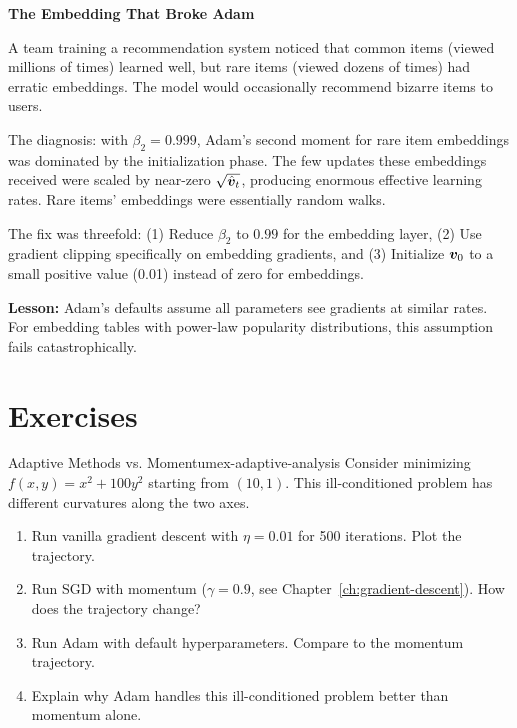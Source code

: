 \documentclass[../../main.tex]{subfiles}
\begin{document}
\begin{warstory}
\textbf{The Embedding That Broke Adam}

A team training a recommendation system noticed that common items (viewed millions of times) learned well, but rare items (viewed dozens of times) had erratic embeddings. The model would occasionally recommend bizarre items to users.

The diagnosis: with $\beta_2 = 0.999$, Adam's second moment for rare item embeddings was dominated by the initialization phase. The few updates these embeddings received were scaled by near-zero $\sqrt{\hat{\boldsymbol{v}}_t}$, producing enormous effective learning rates. Rare items' embeddings were essentially random walks.

The fix was threefold: (1) Reduce $\beta_2$ to $0.99$ for the embedding layer, (2) Use gradient clipping specifically on embedding gradients, and (3) Initialize $\boldsymbol{v}_0$ to a small positive value (0.01) instead of zero for embeddings.

\textbf{Lesson:} Adam's defaults assume all parameters see gradients at similar rates. For embedding tables with power-law popularity distributions, this assumption fails catastrophically.
\end{warstory}

\section{Exercises}
\label{sec:adv-opt-exercises}

\begin{exercise}{Adaptive Methods vs. Momentum}{ex-adaptive-analysis}
Consider minimizing $f(x, y) = x^2 + 100y^2$ starting from $(10, 1)$. This ill-conditioned problem has different curvatures along the two axes.
\begin{enumerate}[label=(\alph*)]
    \item Run vanilla gradient descent with $\eta = 0.01$ for 500 iterations. Plot the trajectory.
    \item Run SGD with momentum ($\gamma = 0.9$, see Chapter~\ref{ch:gradient-descent}). How does the trajectory change?
    \item Run Adam with default hyperparameters. Compare to the momentum trajectory.
    \item Explain why Adam handles this ill-conditioned problem better than momentum alone.
\end{enumerate}
\end{exercise}
\end{document}
